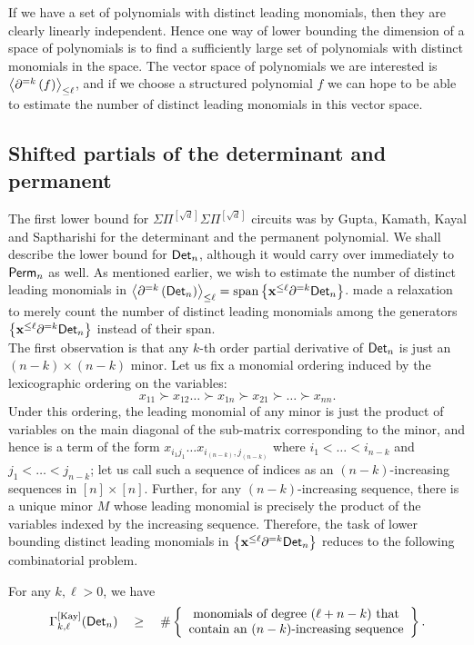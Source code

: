 \documentclass[12pt]{report}
\newcommand{\CM}[1]{\Gamma^{\mathrm{[#1]}}}
\newcommand{\SPD}[3]{\inangle{\partial^{=#1}\inparen{#3}}_{\leq #2}}
\newcommand{\mySPSP}[2]{\Sigma\Pi^{[#1]}\Sigma\Pi^{[#2]}}
\begin{document}
If we have a set of polynomials with distinct leading monomials, then they are clearly linearly independent. Hence one way of lower bounding the dimension of a space of polynomials is to find a sufficiently large set of polynomials with distinct monomials in the space. The vector space of polynomials we are interested is $\SPD{k}{\ell}{f}$, and if we choose a structured polynomial $f$ we can hope to be able to estimate the number of distinct leading monomials in this vector space. 

\subsection{Shifted partials of the determinant and permanent}

The first lower bound for $\mySPSP{\sqrt{d}}{\sqrt{d}}$ circuits was by Gupta, Kamath, Kayal and Saptharishi \cite{gkks13} for the determinant and the permanent polynomial. We shall describe the lower bound for $\mathsf{Det}_n$, although it would carry over immediately to $\mathsf{Perm}_n$ as well. As mentioned earlier, we wish to estimate the number of distinct leading monomials in $\SPD{k}{\ell}{\Det_n} = \mathrm{span}\inbrace{\vecx^{\leq \ell}\partial^{=k}\Det_n}$. \cite{gkks13} made a relaxation to merely count the number of distinct leading monomials among the generators $\left\{\mathbf{x}^{\leq \ell}\partial^{=k}\mathsf{Det}_n\right\}$ instead of their span. \\

The first observation is that any $k$-th order partial derivative of $\mathsf{Det}_n$ is just an $(n-k)\times (n-k)$ minor. Let us fix a monomial ordering induced by the lexicographic ordering on the variables:
$$
x_{11} \succ x_{12} \dots \succ x_{1n} \succ x_{21} \succ \dots \succ x_{nn}.
$$
Under this ordering, the leading monomial of any minor is just the product of variables on the main diagonal of the sub-matrix corresponding to the minor, and hence is a term of the form $x_{i_1j_1}\dots x_{i_{(n-k)},j_{(n-k)}}$ where $i_1 < \dots < i_{n-k}$ and $j_1 < \dots < j_{n-k}$; let us call such a sequence of indices as an $(n-k)$-increasing sequences in $[n]\times [n]$. Further, for any $(n-k)$-increasing sequence, there is a unique minor $M$ whose leading monomial is precisely the product of the variables indexed by the increasing sequence. Therefore, the task of lower bounding distinct leading monomials in $\left\{\mathbf{x}^{\leq \ell}\partial^{=k}\mathsf{Det}_n\right\}$ reduces to the following combinatorial problem.
\begin{claim} For any $k,\ell > 0$,  we have
$$
\CM{Kay}_{k,\ell}(\Det_n) \spaced{\geq} \#\inbrace{\begin{array}{cc}\text{monomials of degree $(\ell + n -k)$ that}\\\text{contain an $(n-k)$-increasing sequence}\end{array}}.
$$
\end{claim}
\end{document}
